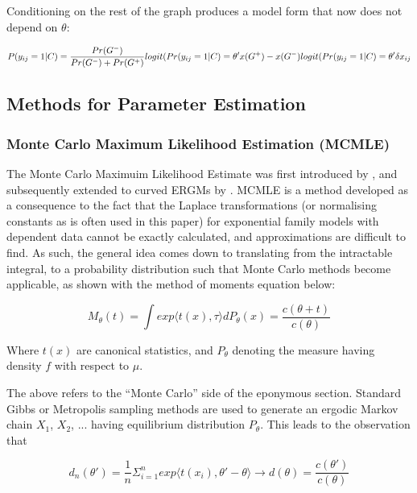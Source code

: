 Conditioning on the rest of the graph produces a model form that now does not depend on $\theta$:

\begin{equation}
\label{eqn:ergm_no_theta}
P(y_{ij} = 1|C) = \frac{Pr(G^-)}{Pr(G^-) + Pr(G^+)} \\
logit(Pr(y_{ij} = 1|C) = \theta'{x(G^+) - x(G^-)} \\
logit(Pr(y_{ij} = 1|C) = \theta'\delta x_{ij}
\end{equation}

\subsection{Methods for Parameter Estimation}

\subsubsection{Monte Carlo Maximum Likelihood Estimation (MCMLE)}

The Monte Carlo Maximuim Likelihood Estimate was first introduced by \cite{geyerthompson1992}, and subsequently extended to curved ERGMs by \cite{hunterhandcock2006}. MCMLE is a method developed as a consequence to the fact that the  Laplace transformations (or normalising constants as is often used in this paper) for exponential family models with dependent data cannot be exactly calculated, and approximations are difficult to find. As such, the general idea comes down to translating from the intractable integral, to a probability distribution such that Monte Carlo methods become applicable, as shown with the method of moments equation below:

\begin{equation}
M_\theta(t) = \int{exp{\langle t(x), \tau \rangle}dP_\theta(x)} = \frac{c(\theta + t)}{c(\theta)}
\end{equation}

Where $t(x)$ are canonical statistics, and $P_\theta$ denoting the measure having density $f$ with respect to $\mu$.

The above refers to the ``Monte Carlo'' side of the eponymous section. Standard Gibbs or Metropolis sampling methods are used to generate an ergodic Markov chain $X_1$, $X_2$, ... having equilibrium distribution $P_\theta$. This leads to the observation that

\begin{equation}
\label{eq:mcmle_importance_sampling}
d_n(\theta') =  \frac{1}{n}\Sigma_{i=1}^n exp{\langle t(x_i), \theta' - \theta \rangle} \rightarrow d(\theta) = \frac{c(\theta')}{c(\theta)}
\end{equation}

